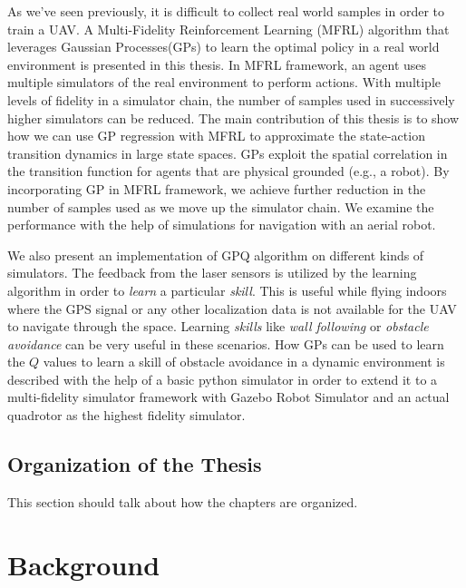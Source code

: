 \documentclass[12pt]{report}
\begin{document}
As we've seen previously, it is difficult to collect real world samples in order to train a UAV. A Multi-Fidelity Reinforcement Learning (MFRL) algorithm that leverages Gaussian Processes(GPs) to learn the optimal policy in a real world environment is presented in this thesis. In MFRL framework, an agent uses multiple simulators of the real environment to perform actions. With multiple levels of fidelity in a simulator chain, the number of samples used in successively higher simulators can be reduced. The main contribution of this thesis is to show how we can use GP regression with MFRL to approximate the state-action transition dynamics in large state spaces. GPs exploit the spatial correlation in the transition function for agents that are physical grounded (e.g., a robot). By incorporating GP in MFRL framework, we achieve further reduction in the number of samples used as we move up the simulator chain. We examine the performance with the help of simulations for navigation with an aerial robot.\par 
We also present an implementation of GPQ algorithm \cite{chowdhary2014off} on different kinds of simulators. The feedback from the laser sensors is utilized by the learning algorithm in order to \textit{learn} a particular \textit{skill}. This is useful while flying indoors where the GPS signal or any other localization data is not available for the UAV to navigate through the space. Learning \textit{skills} like \textit{wall following} or \textit{obstacle avoidance} can be very useful in these scenarios. How GPs can be used to learn the $Q$ values to learn a skill of obstacle avoidance in a dynamic environment is described with the help of a basic python simulator in order to extend it to a multi-fidelity simulator framework with Gazebo Robot Simulator and an actual quadrotor as the highest fidelity simulator.


\section{Organization of the Thesis}

This section should talk about how the chapters are organized.


\chapter{Background} %

\label{background} %
\end{document}
